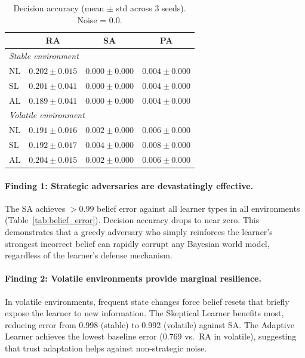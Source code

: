 \documentclass[11pt,letterpaper]{article}
\begin{document}
\begin{table}[h]
\centering
\caption{Decision accuracy (mean $\pm$ std across 3 seeds).  Noise = 0.0.}
\label{tab:accuracy}
\begin{tabular}{lccc}
\toprule
& \textbf{RA} & \textbf{SA} & \textbf{PA} \\
\midrule
\multicolumn{4}{l}{\emph{Stable environment}} \\
NL & $0.202 \pm 0.015$ & $0.000 \pm 0.000$ & $0.004 \pm 0.000$ \\
SL & $0.201 \pm 0.041$ & $0.000 \pm 0.000$ & $0.004 \pm 0.000$ \\
AL & $0.189 \pm 0.041$ & $0.000 \pm 0.000$ & $0.004 \pm 0.000$ \\
\midrule
\multicolumn{4}{l}{\emph{Volatile environment}} \\
NL & $0.191 \pm 0.016$ & $0.002 \pm 0.000$ & $0.006 \pm 0.000$ \\
SL & $0.192 \pm 0.017$ & $0.004 \pm 0.000$ & $0.008 \pm 0.000$ \\
AL & $\mathbf{0.204 \pm 0.015}$ & $0.002 \pm 0.000$ & $0.006 \pm 0.000$ \\
\bottomrule
\end{tabular}
\end{table}

\paragraph{Finding 1: Strategic adversaries are devastatingly effective.}
The SA achieves $>0.99$ belief error against all learner types in all
environments (Table~\ref{tab:belief_error}).  Decision accuracy drops
to near zero.  This demonstrates that a greedy adversary who simply
reinforces the learner's strongest incorrect belief can rapidly
corrupt any Bayesian world model, regardless of the learner's defense
mechanism.

\paragraph{Finding 2: Volatile environments provide marginal resilience.}
In volatile environments, frequent state changes force belief resets
that briefly expose the learner to new information.  The Skeptical
Learner benefits most, reducing error from 0.998 (stable) to 0.992
(volatile) against SA.  The Adaptive Learner achieves the lowest
baseline error (0.769 vs.\ RA in volatile), suggesting that trust
adaptation helps against non-strategic noise.
\end{document}
